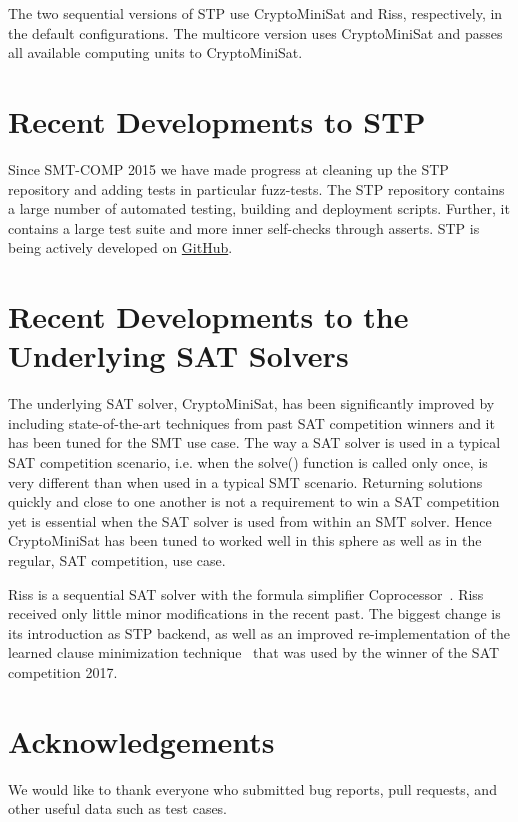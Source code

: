\documentclass{llncs}
\begin{document}
The two sequential versions of STP use CryptoMiniSat and Riss, respectively, in the default configurations.
The multicore version uses CryptoMiniSat and passes all available computing units to CryptoMiniSat.

\section{Recent Developments to STP}
Since SMT-COMP 2015 we have made progress at cleaning up the STP repository and adding tests in particular fuzz-tests. The STP repository contains a large number of automated testing, building and deployment scripts. Further, it contains a large test suite and more inner self-checks through asserts. STP is being actively developed on \href{https://github.com/stp/stp}{GitHub}.

\section{Recent Developments to the Underlying SAT Solvers}
The underlying SAT solver, CryptoMiniSat, has been significantly improved by including state-of-the-art techniques from past SAT competition winners and it has been tuned for the SMT use case. The way a SAT solver is used in a typical SAT competition scenario, i.e. when the solve() function is called only once, is very different than when used in a typical SMT scenario. Returning solutions quickly and close to one another is not a requirement to win a SAT competition yet is essential when the SAT solver is used from within an SMT solver. Hence CryptoMiniSat has been tuned to worked well in this sphere as well as in the regular, SAT competition, use case.

Riss is a sequential SAT solver with the formula simplifier Coprocessor~\cite{10.1007/978-3-642-31612-8_34}.
Riss received only little minor modifications in the recent past.
The biggest change is its introduction as STP backend, as well as an improved re-implementation of the learned clause minimization technique~\cite{ijcai2017-98} that was used by the winner of the SAT competition 2017.

\section*{Acknowledgements}
We would like to thank everyone who submitted bug reports, pull requests, and other useful data such as test cases.




\vfill
\pagebreak
\end{document}
